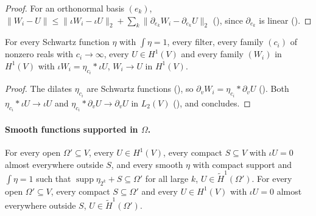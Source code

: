 \begin{proof}
\leanok
For an orthonormal basis $(e_k)$, $\|W_i - U\| \leq \|\iota W_i - \iota U\|_2 + \sum_k
\|\partial_{e_k} W_i - \partial_{e_k} U\|_2$ (), since
$\partial_{e_k}$ is linear ().
\end{proof}

\begin{theorem}[Mollification in $H^1(V)$]
\label{thm:sobolev-one-mollification}
\leanok
{}
For every Schwartz function $\eta$ with $\int \eta = 1$, every filter, every family $(c_i)$ of
nonzero reals with $c_i \to \infty$, every $U \in H^1(V)$ and every family $(W_i)$ in $H^1(V)$ with
$\iota W_i = \eta_{c_i} * \iota U$, $W_i \to U$ in $H^1(V)$.
\end{theorem}

\begin{proof}
\leanok
The dilates $\eta_{c_i}$ are Schwartz functions (), so
$\partial_v W_i = \eta_{c_i} * \partial_v U$ (). Both
$\eta_{c_i} * \iota U \to \iota U$ and $\eta_{c_i} * \partial_v U \to \partial_v U$ in $L_2(V)$
(), and  concludes.
\end{proof}

\paragraph{Smooth functions supported in $\Omega$.}

\begin{theorem}
\label{thm:tilde-space-mollified}
\leanok
{}
For every open $\Omega' \subseteq V$, every $U \in H^1(V)$, every compact $S \subseteq V$ with
$\iota U = 0$ almost everywhere outside $S$, and every smooth $\eta$ with compact support and
$\int \eta = 1$ such that $\operatorname{supp} \eta_{2^k} + S \subseteq \Omega'$ for all large
$k$, $U \in \tilde H^1(\Omega')$. For every open $\Omega' \subseteq V$, every compact
$S \subseteq \Omega'$ and every $U \in H^1(V)$ with $\iota U = 0$ almost everywhere outside $S$,
$U \in \tilde H^1(\Omega')$.
\end{theorem}

